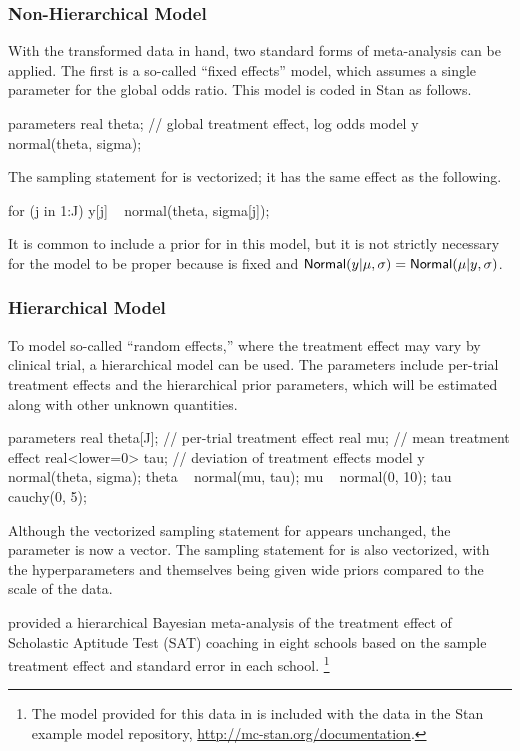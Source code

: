 \subsubsection{Non-Hierarchical Model}

With the transformed data in hand, two standard forms of meta-analysis
can be applied.  The first is a so-called ``fixed effects'' model,
which assumes a single parameter for the global odds ratio.  This
model is coded in Stan as follows.
%
\begin{stancode}
parameters {
  real theta;  // global treatment effect, log odds
}
model {
  y ~ normal(theta, sigma);
}
\end{stancode}
%
The sampling statement for  is vectorized; it has the same
effect as the following.
\begin{stancode}
  for (j in 1:J)
    y[j] ~ normal(theta, sigma[j]);
\end{stancode}
%
It is common to include a prior for  in this model, but it
is not strictly necessary for the model to be proper because 
is fixed and $\distro{Normal}(y|\mu,\sigma) =
\distro{Normal}(\mu|y,\sigma)$.

\subsubsection{Hierarchical Model}

To model so-called ``random effects,'' where the treatment effect may
vary by clinical trial, a hierarchical model can be used.  The
parameters include per-trial treatment effects and the hierarchical
prior parameters, which will be estimated along with other unknown
quantities.  
%
\begin{stancode}
parameters {
  real theta[J];      // per-trial treatment effect
  real mu;            // mean treatment effect
  real<lower=0> tau;  // deviation of treatment effects
}
model {
  y ~ normal(theta, sigma);
  theta ~ normal(mu, tau);
  mu ~ normal(0, 10);
  tau ~ cauchy(0, 5);
}
\end{stancode}
%
Although the vectorized sampling statement for  appears
unchanged, the parameter  is now a vector.  The sampling
statement for  is also vectorized, with the
hyperparameters  and  themselves being given wide
priors compared to the scale of the data.

\citet{Rubin:1981} provided a hierarchical Bayesian meta-analysis of
the treatment effect of Scholastic Aptitude Test (SAT) coaching in
eight schools based on the sample treatment effect and standard error
in each school.%
%
\footnote{The model provided for this data in
\citep[Section~5.5]{GelmanEtAl:2013} is included with the
data in the Stan example model repository, 
\url{http://mc-stan.org/documentation}.}

